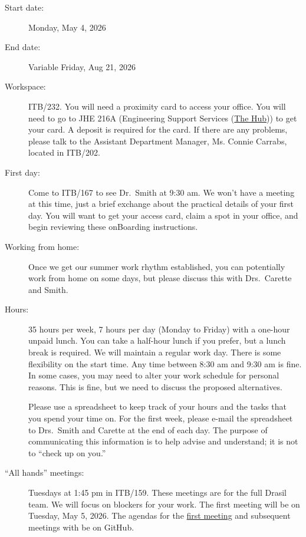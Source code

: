 \documentclass[12pt]{article}
\begin{document}
\begin{description}

\item [Start date:] Monday, May 4, 2026

\item [End date:] Variable Friday, Aug 21, 2026

\item [Workspace:] ITB/232. You will need a proximity card to access your
office.  You will need to go to JHE 216A (Engineering Support Services
(\href{https://www.eng.mcmaster.ca/engineering-support-services-hub/} {The
Hub})) to get your card.  A deposit is required for the card.  If there are any
problems, please talk to the Assistant Department Manager, Ms. Connie Carrabs,
located in ITB/202.

\item [First day:] Come to ITB/167 to see Dr.\ Smith at 9:30 am.  We won't have
a meeting at this time, just a brief exchange about the practical details of
your first day.  You will want to get your access card, claim a spot in your office,
and begin reviewing these onBoarding instructions.

\item [Working from home:] Once we get our summer work rhythm established, you
can potentially work from home on some days, but please discuss this with Drs.\
Carette and Smith.

\item [Hours:] 35 hours per week, 7 hours per day (Monday to Friday) with a
one-hour unpaid lunch.  You can take a half-hour lunch if you prefer, but a
lunch break is required. We will maintain a regular work day.  There is some
flexibility on the start time.  Any time between 8:30 am and 9:30 am is fine.
In some cases, you may need to alter your work schedule for personal reasons.
This is fine, but we need to discuss the proposed alternatives.

Please use a spreadsheet to keep track of your hours and the tasks that you
spend your time on.  For the first week, please e-mail the spreadsheet to Drs.\
Smith and Carette at the end of each day.  The purpose of communicating this
information is to help advise and understand; it is not to ``check up on you.''


\item [``All hands'' meetings:] Tuesdays at 1:45 pm in ITB/159.  These meetings are for the full Drasil team.  We will focus on blockers for your work.  The first meeting will be on Tuesday, May 5, 2026.  The agendas for the
\href{https://github.com/JacquesCarette/Drasil/issues/4937} {first meeting} and subsequent meetings with be on GitHub.
\end{description}
\end{document}
